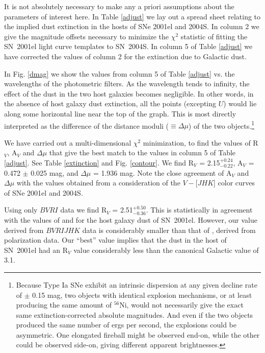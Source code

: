 \documentclass[12pt,preprint,psfig,epsf]{aastex}
\newcommand{\bvri}{\protect\hbox{$BV\!RI$} }
\newcommand{\bvrijhk}{\protect\hbox{$BV\!RIJHK$} }
\begin{document}
It is not absolutely necessary to make any a priori assumptions about the
parameters of interest here.  In Table \ref{adjust} we lay out a spread sheet
relating to the implied dust extinction in the hosts of SNe 2001el and 2004S.  
In column 2 we give the magnitude offsets necessary to minimize the $\chi^2$
statistic of fitting the SN~2001el light curve templates to SN~2004S.  
In column 5 of Table \ref{adjust} we have corrected the values of
column 2 for the extinction due to Galactic dust.

In Fig. \ref{dmag} we show the values from column 5 of Table \ref{adjust} vs. the
wavelengths of the photometric filters.  As the wavelength tends to infinity, the
effect of the dust in the two host galaxies becomes negligible.  In other words,
in the absence of host galaxy dust extinction, all the points (excepting $U$)
would lie along some horizontal line near the top of the graph.  This is most
directly interpreted as the difference of the distance moduli ($\equiv \Delta\mu$)  
of the two objects.\footnote[20]{Because Type Ia SNe exhibit an intrinsic
dispersion at any given decline rate of $\pm$ 0.15 mag, two objects with identical
explosion mechanisms, or at least producing the same amount of $^{56}$Ni, would
not necessarily give the exact same extinction-corrected absolute magnitudes.  
And even if the two objects produced the same number of ergs per second, the
explosions could be asymmetric.  One elongated fireball might be observed end-on,
while the other could be observed side-on, giving different apparent
brightnesses.}

We have carried out a multi-dimensional $\chi^2$ minimization, to find the values
of R$_V$, A$_V$ and $\Delta\mu$ that give the best match to the values in column
5 of Table \ref{adjust}.  See Table \ref{extinction} and Fig. \ref{contour}. We
find R$_V$ = 2.15$^{+0.24}_{-0.22}$, A$_V$ = 0.472 $\pm$ 0.025 mag, and
$\Delta\mu$ = 1.936 mag.  Note the close agreement of A$_V$ and $\Delta\mu$ with the
values obtained from a consideration of the $V-$[$JHK$] color curves of
SNe 2001el and 2004S.

Using only \bvri data we find R$_V$ = 2.51$^{+0.50}_{-0.36}$.  This is
statistically in agreement with the values of \citet{Jha_etal06b} and
\citet{Wan_etal03b} for the host galaxy dust of SN~2001el.  However, our value
derived from \bvrijhk data is considerably smaller than that of
\citet{Wan_etal03b}, derived from polarization data.  Our ``best'' value
implies that the dust in the host of SN~2001el had an R$_V$ value considerably
less than the canonical Galactic value of 3.1.
\end{document}
